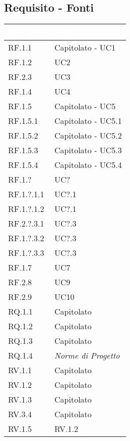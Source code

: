 \subsection{Requisito - Fonti}
\begin{center}
  \centering
  \begin{longtable}{|C{6cm}|C{6cm}|}
    \hline
    \textcolor[HTML]{FFFFFF}{\textbf{Requisito}} & \textcolor[HTML]{FFFFFF}{\textbf{Fonti}} \\ \hline
    RF.1.1 & Capitolato - UC1 \\ \hline
    RF.1.2 & UC2 \\ \hline
    RF.2.3 & UC3 \\ \hline
    RF.1.4 & UC4 \\ \hline
    RF.1.5 & Capitolato - UC5 \\ \hline
    RF.1.5.1 & Capitolato - UC5.1 \\ \hline
    RF.1.5.2 & Capitolato - UC5.2 \\ \hline
    RF.1.5.3 & Capitolato - UC5.3 \\ \hline
    RF.1.5.4 & Capitolato - UC5.4 \\ \hline
    RF.1.? & UC? \\ \hline
    RF.1.?.1.1 & UC?.1 \\ \hline
    RF.1.?.1.2 & UC?.1 \\ \hline
    RF.2.?.3.1 & UC?.3 \\ \hline
    RF.1.?.3.2 & UC?.3 \\ \hline
    RF.1.?.3.3 & UC?.3 \\ \hline
    RF.1.7 & UC7 \\ \hline
    RF.2.8 & UC9 \\ \hline
    RF.2.9 & UC10 \\ \hline
    RQ.1.1 & Capitolato \\ \hline
    RQ.1.2 & Capitolato \\ \hline
    RQ.1.3 & Capitolato \\ \hline
    RQ.1.4 & \textit{Norme di Progetto} \\ \hline
    RV.1.1 & Capitolato \\ \hline
    RV.1.2 & Capitolato \\ \hline
    RV.1.3 & Capitolato \\ \hline
    RV.3.4 & Capitolato \\ \hline
    RV.1.5 & RV.1.2 \\ \hline


\end{longtable}
\end{center}
